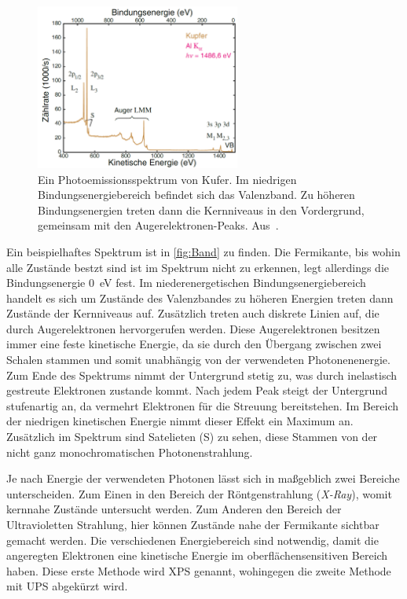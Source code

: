         \begin{figure}
            \centering
            \includegraphics[width=0.6\textwidth]{./content/Band}
            \caption{Ein Photoemissionsspektrum von Kufer.
            Im niedrigen Bindungsenergiebereich befindet sich das Valenzband. 
            Zu höheren Bindungsenergien treten dann die Kernniveaus in den Vordergrund, gemeinsam mit den Augerelektronen-Peaks.
            Aus~\cite{Fauster}.}
            \label{fig:Band}
        \end{figure}
        Ein beispielhaftes Spektrum ist in \autoref{fig:Band} zu finden.
        Die Fermikante, bis wohin alle Zustände bestzt sind ist im Spektrum nicht zu erkennen, legt allerdings die Bindungsenergie \SI{0}{\electronvolt} fest.
        Im niederenergetischen Bindungsenergiebereich handelt es sich um Zustände des Valenzbandes zu höheren Energien treten dann Zustände der Kernniveaus auf.
        Zusätzlich treten auch diskrete Linien auf, die durch Augerelektronen hervorgerufen werden.
        Diese Augerelektronen besitzen immer eine feste kinetische Energie, da sie durch den Übergang zwischen zwei Schalen stammen und somit unabhängig von der verwendeten Photonenenergie.
        Zum Ende des Spektrums nimmt der Untergrund stetig zu, was durch inelastisch gestreute Elektronen zustande kommt.
        Nach jedem Peak steigt der Untergrund stufenartig an, da vermehrt Elektronen für die Streuung bereitstehen.
        Im Bereich der niedrigen kinetischen Energie nimmt dieser Effekt ein Maximum an.
        Zusätzlich im Spektrum sind Satelieten (S) zu sehen, diese Stammen von der nicht ganz monochromatischen Photonenstrahlung. %

        Je nach Energie der verwendeten Photonen lässt sich in maßgeblich zwei Bereiche unterscheiden.
        Zum Einen in den Bereich der Röntgenstrahlung (\textit{X-Ray}), womit kernnahe Zustände untersucht werden.
        Zum Anderen den Bereich der Ultravioletten Strahlung, hier können Zustände nahe der Fermikante sichtbar gemacht werden.
        Die verschiedenen Energiebereich sind notwendig, damit die angeregten Elektronen eine kinetische Energie im oberflächensensitiven Bereich haben.
        Diese erste Methode wird XPS genannt, wohingegen die zweite Methode mit UPS abgekürzt wird.

